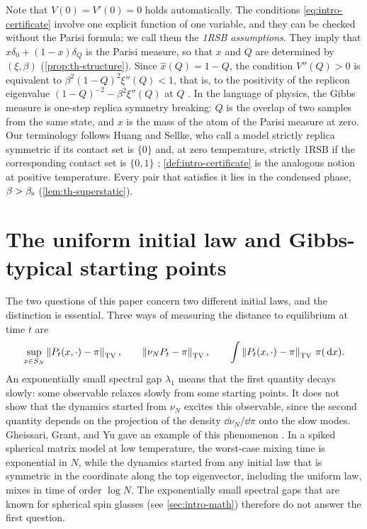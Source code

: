 Note that $V(0)=V'(0)=0$ holds automatically. The conditions \eqref{eq:intro-certificate} involve one explicit function of one variable, and they can be checked without the Parisi formula; we call them the \emph{1RSB assumptions}. They imply that $x\delta_0+(1-x)\delta_Q$ is the Parisi measure, so that $x$ and $Q$ are determined by $(\xi,\beta)$ (\cref{prop:th-structure}). Since $\hat x(Q)=1-Q$, the condition $V''(Q)>0$ is equivalent to $\beta^2(1-Q)^2\xi''(Q)<1$, that is, to the positivity of the replicon eigenvalue $(1-Q)^{-2}-\beta^2\xi''(Q)$ at $Q$ \cite[Section~1.3]{BenArousJagannath2018}. In the language of physics, the Gibbs measure is one-step replica symmetry breaking: $Q$ is the overlap of two samples from the same state, and $x$ is the mass of the atom of the Parisi measure at zero. Our terminology follows Huang and Sellke, who call a model strictly replica symmetric if its contact set is $\{0\}$ \cite[Definition~3]{HuangSellke2024} and, at zero temperature, strictly 1RSB if the corresponding contact set is $\{0,1\}$ \cite[Definition~4]{HuangSellke2024}; \cref{def:intro-certificate} is the analogous notion at positive temperature. Every pair that satisfies it lies in the condensed phase, $\beta>\beta_{\mathrm s}$ (\cref{lem:th-superstatic}).

\section{The uniform initial law and Gibbs-typical starting points}\label{sec:intro-starts}

The two questions of this paper concern two different initial laws, and the distinction is essential. Three ways of measuring the distance to equilibrium at time $t$ are
\begin{equation*}
\sup_{x\in S_N}\left\lVert P_t(x,\cdot)-\pi\right\rVert_{\mathrm{TV}},\qquad\left\lVert\nu_NP_t-\pi\right\rVert_{\mathrm{TV}},\qquad\int\left\lVert P_t(x,\cdot)-\pi\right\rVert_{\mathrm{TV}}\,\pi(\,\mathrm d x).
\end{equation*}
An exponentially small spectral gap $\lambda_1$ means that the first quantity decays slowly: some observable relaxes slowly from some starting points. It does not show that the dynamics started from $\nu_N$ excites this observable, since the second quantity depends on the projection of the density $\dd\nu_N/\dd\pi$ onto the slow modes. Gheissari, Grant, and Yu gave an example of this phenomenon \cite[Theorem~1.2]{GheissariGrantYu2026}.
In a spiked spherical matrix model at low temperature, the worst-case mixing time is exponential in $N$, while the dynamics started from any initial law that is symmetric in the coordinate along the top eigenvector, including the uniform law, mixes in time of order $\log N$. The exponentially small spectral gaps that are known for spherical spin glasses (see \cref{sec:intro-math}) therefore do not answer the first question.


